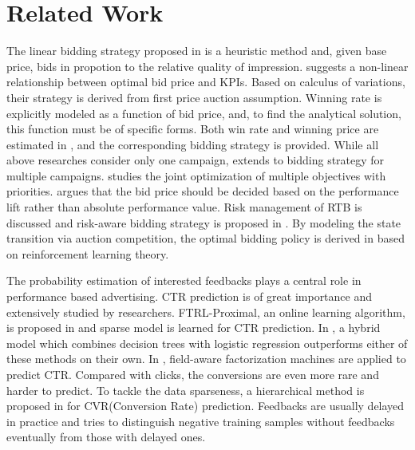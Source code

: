 \documentclass[sigconf]{acmart}
\begin{document}

\section{Related Work}

The linear bidding strategy proposed in \cite{M6D} is a heuristic method and,
    given base price, bids in propotion to the relative quality of impression.
\cite{WeinanZhang2014} suggests a non-linear relationship between optimal bid price and KPIs.
Based on calculus of variations, their strategy is derived from first price auction assumption.
Winning rate is explicitly modeled as a function of bid price, and,
    to find the analytical solution, this function must be of specific forms.
Both win rate and winning price are estimated in \cite{XiangLi2014}, and the corresponding bidding strategy is provided.
While all above researches consider only one campaign,
    \cite{WeinanZhang2015} extends \cite{WeinanZhang2014} to bidding strategy for multiple campaigns.
\cite{Joint2016} studies the joint optimization of multiple objectives with priorities.
\cite{Lift2016} argues that the bid price should be decided
    based on the performance lift rather than absolute performance value.
Risk management of RTB is discussed and risk-aware bidding strategy is proposed in \cite{Risk2017}.
By modeling the state transition via auction competition,
    the optimal bidding policy is derived in \cite{Reinforce2017} based on reinforcement learning theory.

The probability estimation of interested feedbacks plays a central role in performance based advertising.
CTR prediction is of great importance and extensively studied by researchers.
FTRL-Proximal, an online learning algorithm, is proposed in \cite{Google2013} and sparse model is learned for CTR prediction.
In \cite{Facebook2014}, a hybrid model which combines decision trees with logistic regression
    outperforms either of these methods on their own.
In \cite{FFM2016}, field-aware factorization machines are applied to predict CTR.
Compared with clicks, the conversions are even more rare and harder to predict.
To tackle the data sparseness, a hierarchical method is proposed in \cite{CVR} for CVR(Conversion Rate) prediction.
Feedbacks are usually delayed in practice and \cite{DelayedFeedback} tries to
    distinguish negative training samples without feedbacks eventually from those with delayed ones.
\end{document}
